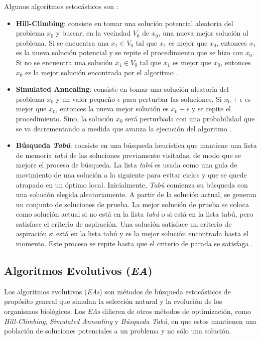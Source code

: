 Algunos algoritmos estocásticos son \cite{PSO_0}:
\begin{itemize}
    \item \textbf{Hill-Climbing}: consiste en tomar una solución potencial
aleatoria del problema $x_0$ y buscar, en la vecindad $V_0$ de $x_0$, una nueva
mejor solución al problema. Si se encuentra una $x_1 \in V_0$ tal que $x_1$ es
mejor que $x_0$, entonces $x_1$ es la nueva solución potencial y se repite el
procedimiento que se hizo con $x_0$. Si no se encuentra una solución $x_1 \in V_0$
tal que $x_1$ es mejor que $x_0$, entonces $x_0$ es la mejor solución encontrada
por el algoritmo \cite{TA_1}.
    \item \textbf{Simulated Annealing}: consiste en tomar una solución aleatoria
del problema $x_0$ y un valor pequeño $\epsilon$ para perturbar las soluciones.
Si $x_0 + \epsilon$ es mejor que $x_0$, entonces la nueva mejor solución es 
$x_0 + \epsilon$ y se repite el procedimiento. Sino, la solución $x_0$ será
perturbada con una probabilidad que se va decrementando a medida que avanza la
ejecución del algoritmo \cite{SA_2}.
    \item \textbf{Búsqueda \emph{Tabú}}: consiste en una búsqueda heurística que
mantiene una lista de memoria \emph{tabú} de las soluciones previamente visitadas, de
modo que se mejore el proceso de búsqueda. La lista \emph{tabú} es usada como una guía
de movimiento de una solución a la siguiente para evitar ciclos \cite{SA_5} y que
se quede atrapado en un óptimo local. Inicialmente, \emph{Tabú} comienza su búsqueda
con una solución elegida aleatoriamente. A partir de la solución actual, se
generan un conjunto de soluciones de prueba. La mejor solución de prueba se
coloca como solución actual si no está en la lista \emph{tabú} o si está en la lista
tabú, pero satisface el criterio de aspiración. Una solución satisface un
criterio de aspiración si está en la lista tabú y es la mejor solución
encontrada hasta el momento. Este proceso se repite hasta que el criterio de
parada se satisfaga \cite{SA_3}\cite{SA_4}.
\end{itemize}
    
\subsection{Algoritmos Evolutivos (\emph{EA})}
    Los algoritmos evolutivos (\emph{EAs}) son métodos de búsqueda estocásticos de
propósito general que simulan la selección natural y la evolución de los
organismos biológicos. Los \emph{EAs} difieren de otros métodos de optimización,
como \emph{Hill-Climbing}, \emph{Simulated Annealing} y \emph{Búsqueda Tabú}, en
que estos mantienen una población de soluciones potenciales a un
problema y no sólo una solución.

